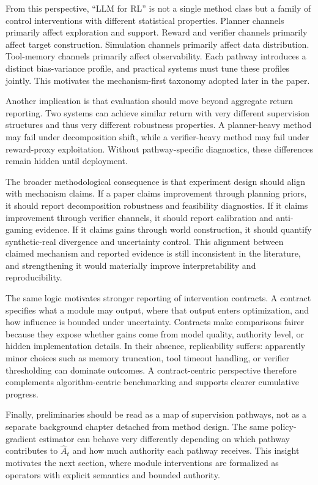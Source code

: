 \documentclass[pdflatex,sn-mathphys-num]{sn-jnl}
\begin{document}
From this perspective, ``LLM for RL'' is not a single method class but a family of control interventions with different statistical properties. Planner channels primarily affect exploration and support. Reward and verifier channels primarily affect target construction. Simulation channels primarily affect data distribution. Tool-memory channels primarily affect observability. Each pathway introduces a distinct bias-variance profile, and practical systems must tune these profiles jointly. This motivates the mechanism-first taxonomy adopted later in the paper.

Another implication is that evaluation should move beyond aggregate return reporting. Two systems can achieve similar return with very different supervision structures and thus very different robustness properties. A planner-heavy method may fail under decomposition shift, while a verifier-heavy method may fail under reward-proxy exploitation. Without pathway-specific diagnostics, these differences remain hidden until deployment.

The broader methodological consequence is that experiment design should align with mechanism claims. If a paper claims improvement through planning priors, it should report decomposition robustness and feasibility diagnostics. If it claims improvement through verifier channels, it should report calibration and anti-gaming evidence. If it claims gains through world construction, it should quantify synthetic-real divergence and uncertainty control. This alignment between claimed mechanism and reported evidence is still inconsistent in the literature, and strengthening it would materially improve interpretability and reproducibility.

The same logic motivates stronger reporting of intervention contracts. A contract specifies what a module may output, where that output enters optimization, and how influence is bounded under uncertainty. Contracts make comparisons fairer because they expose whether gains come from model quality, authority level, or hidden implementation details. In their absence, replicability suffers: apparently minor choices such as memory truncation, tool timeout handling, or verifier thresholding can dominate outcomes. A contract-centric perspective therefore complements algorithm-centric benchmarking and supports clearer cumulative progress.

Finally, preliminaries should be read as a map of supervision pathways, not as a separate background chapter detached from method design. The same policy-gradient estimator can behave very differently depending on which pathway contributes to $\hat{A}_t$ and how much authority each pathway receives. This insight motivates the next section, where module interventions are formalized as operators with explicit semantics and bounded authority.
\end{document}
